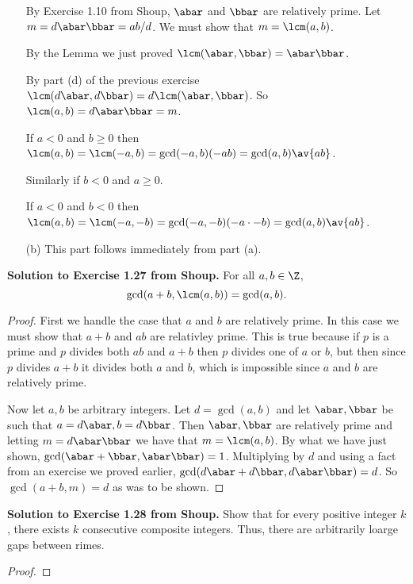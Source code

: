 \documentclass[oneside,12pt]{amsart}
\begin{document}
\begin{enumerate}
By Exercise 1.10 from Shoup, $\abar$ and $\bbar$ are relatively prime.
Let $m=d\abar\bbar = ab/d$. We must show that $m=\lcm(a,b)$.

By the Lemma we just proved $\lcm(\abar,\bbar) = \abar \bbar$.

By part (d) of the previous exercise $\lcm(d\abar,d\bbar) = d\lcm(\abar,\bbar)$.
So $\lcm(a,b) = d\abar\bbar=m$.

If $a<0$ and $b\geq 0$ then $\lcm(a,b) = \lcm(-a,b) = \gcd(-a,b) (-ab) = \gcd(a,b) \av{ab}$.

Similarly if $b<0$ and $a\geq 0$.

If $a<0$ and $b<0$ then $\lcm(a,b) = \lcm(-a,-b) = \gcd(-a,-b) (-a\cdot -b) = \gcd(a,b) \av{ab}$.

\item[(b)] This part follows immediately from part (a).
\end{enumerate}

\bigskip

\textbf{Solution to Exercise 1.27 from Shoup.} For all $a,b\in\Z$,
$$\gcd(a+b,\lcm(a,b)) = \gcd(a,b).$$
\begin{proof}
First we handle the case that $a$ and $b$ are relatively prime. In this case we must show that
$a+b$ and $ab$ are relativley prime. This is true because if $p$ is a prime and $p$ divides
both $ab$ and $a+b$ then $p$ divides one of $a$ or $b$, but then since $p$ divides $a+b$ it
divides both $a$ and $b$, which is impossible since $a$ and $b$ are relatively prime.

Now let $a,b$ be arbitrary integers. Let $d=\gcd(a,b)$ and let $\abar,\bbar$ be such that
$a=d\abar,b=d\bbar$. Then $\abar,\bbar$ are relatively prime and letting $m=d\abar\bbar$ we have
that $m=\lcm(a,b)$. By what we have just shown,
$\gcd(\abar+\bbar,\abar\bbar) = 1$. Multiplying by $d$ and using a fact from an exercise we proved earlier,
$\gcd(d\abar+d\bbar,d\abar\bbar)=d$. So $\gcd(a+b,m)=d$ as was to be shown.
\end{proof}

\bigskip

\textbf{Solution to Exercise 1.28 from Shoup.} Show that for every positive integer $k$, there exists $k$
consecutive composite integers. Thus, there are arbitrarily loarge gaps
between rimes.

\begin{proof}
\end{proof}
\end{document}
